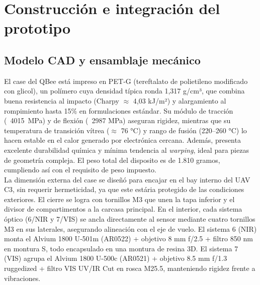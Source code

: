 
  

  \section{Construcción e integración del prototipo}
  \subsection{Modelo CAD y ensamblaje mecánico}

    El case del QBee está impreso en PET‑G (tereftalato de polietileno modificado con glicol), un polímero cuya densidad típica ronda 1,317 g/cm³, que combina buena resistencia al impacto (Charpy $\approx$ 4,03 kJ/m²) y alargamiento al rompimiento hasta 15\% en formulaciones estándar. Su módulo de tracción (~4015 MPa) y de flexión (~2987 MPa) aseguran rigidez, mientras que su temperatura de transición vítrea ($\approx$ 76 °C) y rango de fusión (220–260 °C) lo hacen estable en el calor generado por electrónica cercana. Además, presenta excelente durabilidad química y mínima tendencia al \emph{warping}, ideal para piezas de geometría compleja. El peso total del disposito es de 1.810 gramos, cumpliendo así con el requisito de peso impuesto.\\

    \noindent La dimensión externa del case se diseñó para encajar en el bay interno del UAV C3, sin requerir hermeticidad, ya que este estária protegido de las condiciones exteriores. El cierre se logra con tornillos M3 que unen la tapa inferior y el divisor de compartimentos a la carcasa principal. En el interior, cada sistema óptico (6/NIR y 7/VIS) se ancla directamente al sensor mediante cuatro tornillos M3 en sus laterales, asegurando alineación con el eje de vuelo. El sistema 6 (NIR) monta el Alvium 1800 U‑501m (AR0522) + objetivo 8 mm f/2.5 + filtro 850 nm en montura S, todo encapsulado en una montura de resina 3D. El sistema 7 (VIS) agrupa el Alvium 1800 U-500c (AR0521) + objetivo 8.5 mm f/1.3 ruggedized + filtro VIS UV/IR Cut en rosca M25.5, manteniendo rigidez frente a vibraciones.\\
    
